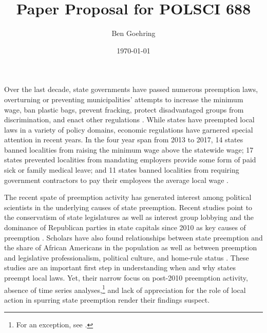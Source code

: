 \documentclass[12pt]{article}
\title{Paper Proposal for POLSCI 688}
\author{Ben Goehring}
\date{\today}
\begin{document}
\begin{titlepage}
\maketitle
\end{titlepage}

Over the last decade, state governments have passed numerous preemption laws, overturning or preventing municipalities' attempts to increase the minimum wage, ban plastic bags, prevent fracking, protect disadvantaged groups from discrimination, and enact other regulations \parencite{dupuisCityRightsEra2018,schraggerStatePreemptionLocal2017}. While states have preempted local laws in a variety of policy domains, economic regulations have garnered special attention in recent years. In the four year span from 2013 to 2017, 14 states banned localities from raising the minimum wage above the statewide wage; 17 states prevented localities from mandating employers provide some form of paid sick or family medical leave; and 11 states banned localities from requiring government contractors to pay their employees the average local wage \parencite{vonwilpertCityGovernmentsAre2017}.

The recent spate of preemption activity has generated interest among political scientists in the underlying causes of state preemption. Recent studies point to the conservatism of state legislatures \parencite{goodmanStateLegislativeIdeology2019} as well as interest group lobbying and the dominance of Republican parties in state capitals since 2010 as key causes of preemption \parencite{hicksHomeRuleBe2018,fowlerStatePreemptionLocal2019,flavinExplainingStatePreemption2019,riverstone-newellRiseStatePreemption2017}. Scholars have also found relationships between state preemption and the share of African Americans in the population \parencite{flavinExplainingStatePreemption2019} as well as between preemption and legislative professionalism, political culture, and home-rule status \parencite{fowlerStatePreemptionLocal2019}. These studies are an important first step in understanding when and why states preempt local laws. Yet, their narrow focus on post-2010 preemption activity, absence of time series analyses,\footnote{For an exception, see \textcite{goodmanStateLegislativeIdeology2019}.} and lack of appreciation for the role of local action in spurring state preemption render their findings suspect.
\end{document}

